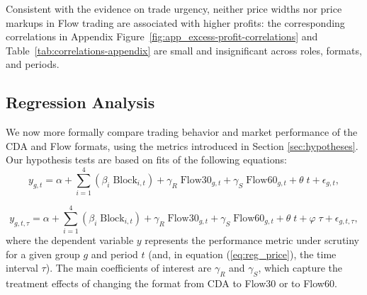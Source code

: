 \documentclass[12pt]{article}
\begin{document}
Consistent with the evidence on trade urgency, neither price widths nor price markups in Flow trading are associated with higher profits: the corresponding correlations in Appendix {Figure~\ref{fig:app_excess-profit-correlations} and Table~\ref{tab:correlations-appendix}} are small and insignificant across roles, formats, and periods.











\subsection{Regression Analysis}\label{sect:RegResults}

We now more formally compare  trading behavior and market performance of the CDA and Flow formats, using the metrics introduced in Section \ref{sec:hypotheses}.
Our hypothesis tests %
are based on fits of the following equations: 
\begin{equation} \label{eq:reg}
    y_{g,t} = \alpha + \sum^{4}_{i = 1} \left(\beta_i \; \text{Block}_{i,t} \right) + \gamma_R \; \text{Flow30}_{g,t}+ \gamma_S \; \text{Flow60}_{g,t} + \theta \; t + \epsilon_{g,t},
\end{equation}

\begin{equation} \label{eq:reg_price}
    y_{g,t,\tau} = \alpha + \sum^{4}_{i = 1} \left(\beta_i \; \text{Block}_{i,t}\right) + \gamma_R \; \text{Flow30}_{g,t} + \gamma_S \; \text{Flow60}_{g,t}+ \theta \; t + \varphi \; \tau + \epsilon_{g,t, \tau}, 
\end{equation}
where the dependent variable $y$ represents the performance metric under scrutiny for a given group $g$ and period $t$ (and, in equation (\ref{eq:reg_price}), the time interval $\tau$). 
The main coefficients of interest are $\gamma_R$ and $\gamma_S$, which capture the treatment effects of changing the format from CDA to Flow30 or to Flow60.
\end{document}
